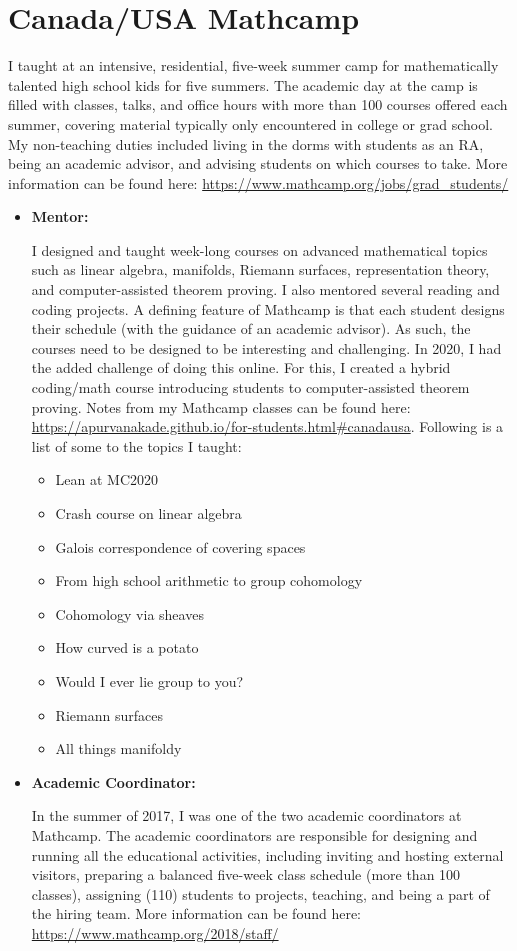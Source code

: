 \documentclass[
]{report}
\providecommand{\tightlist}{%
  \setlength{\itemsep}{0pt}\setlength{\parskip}{0pt}}
\begin{document}
\hypertarget{canadausa-mathcamp}{%
\section{Canada/USA Mathcamp}\label{canadausa-mathcamp}}

I taught at an intensive, residential, five-week summer camp for mathematically talented high school
kids for five summers. The academic day at the camp is filled with classes, talks, and office hours with
more than 100 courses offered each summer, covering material typically only encountered in college or
grad school. My non-teaching duties included living in the dorms with students as an RA, being an
academic advisor, and advising students on which courses to take. More information can be found here:
\url{https://www.mathcamp.org/jobs/grad_students/}

\begin{itemize}
\item
  \textbf{Mentor:}

  I designed and taught week-long courses on advanced mathematical topics such as linear algebra, manifolds, Riemann surfaces, representation theory, and computer-assisted theorem proving. I also mentored several reading and coding projects. A defining feature of Mathcamp is that each student designs their schedule (with the guidance of an academic advisor). As such, the courses need to be designed to be interesting and challenging. In 2020, I had the added challenge of doing this online. For this, I created a hybrid coding/math course introducing students to computer-assisted theorem proving.
  Notes from my Mathcamp classes can be found here: \url{https://apurvanakade.github.io/for-students.html\#canadausa}.
  Following is a list of some to the topics I taught:

  \begin{itemize}
  \tightlist
  \item
    Lean at MC2020
  \item
    Crash course on linear algebra
  \item
    Galois correspondence of covering spaces
  \item
    From high school arithmetic to group cohomology
  \item
    Cohomology via sheaves
  \item
    How curved is a potato
  \item
    Would I ever lie group to you?
  \item
    Riemann surfaces
  \item
    All things manifoldy
  \end{itemize}
\item
  \textbf{Academic Coordinator:}

  In the summer of 2017, I was one of the two academic coordinators at Mathcamp.
  The academic coordinators are responsible for designing and running all the educational activities, including inviting and hosting external visitors, preparing a balanced five-week class schedule (more than 100 classes), assigning (110) students to projects, teaching, and being a part of the hiring team.
  More information can be found here: \url{https://www.mathcamp.org/2018/staff/}
\end{itemize}
\end{document}
